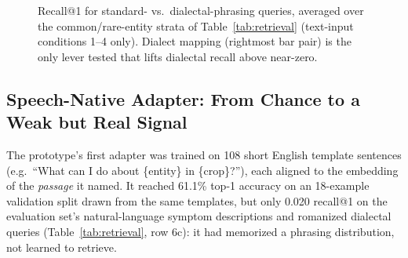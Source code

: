 \documentclass[conference]{IEEEtran}
\begin{document}
\begin{figure}[t]
\centering
{}
\caption{Recall@1 for standard- vs.\ dialectal-phrasing queries, averaged over the common/rare-entity strata of Table~\ref{tab:retrieval} (text-input conditions 1--4 only). Dialect mapping (rightmost bar pair) is the only lever tested that lifts dialectal recall above near-zero.}
\label{fig:retrieval-chart}
\end{figure}

\subsection{Speech-Native Adapter: From Chance to a Weak but Real Signal}
The prototype's first adapter was trained on 108 short English template sentences (e.g.\ ``What can I do about \{entity\} in \{crop\}?''), each aligned to the embedding of the \emph{passage} it named. It reached 61.1\% top-1 accuracy on an 18-example validation split drawn from the same templates, but only 0.020 recall@1 on the evaluation set's natural-language symptom descriptions and romanized dialectal queries (Table~\ref{tab:retrieval}, row 6c): it had memorized a phrasing distribution, not learned to retrieve.
\end{document}
